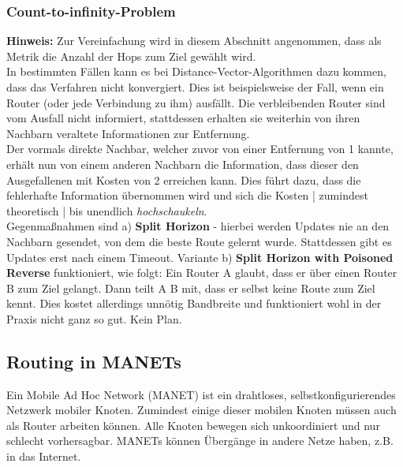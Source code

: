 \documentclass{article} %
\begin{document}
\subsubsection{Count-to-infinity-Problem}
\textbf{Hinweis:} Zur Vereinfachung wird in diesem Abschnitt angenommen, dass als Metrik die Anzahl der Hops zum Ziel gewählt wird.\\
In bestimmten Fällen kann es bei Distance-Vector-Algorithmen dazu kommen, dass das Verfahren nicht konvergiert.
Dies ist beispielsweise der Fall, wenn ein Router (oder jede Verbindung zu ihm) ausfällt.
Die verbleibenden Router sind vom Ausfall nicht informiert, stattdessen erhalten sie weiterhin von ihren Nachbarn veraltete Informationen zur Entfernung.\\
Der vormals direkte Nachbar, welcher zuvor von einer Entfernung von 1 kannte, erhält nun von einem anderen Nachbarn die Information, dass dieser den Ausgefallenen mit Kosten von 2 erreichen kann.
Dies führt dazu, dass die fehlerhafte Information übernommen wird und sich die Kosten | zumindest theoretisch | bis unendlich \emph{hochschaukeln}.\\
Gegenmaßnahmen sind a) \textbf{Split Horizon} - hierbei werden Updates nie an den Nachbarn gesendet, von dem die beste Route gelernt wurde.
Stattdessen gibt es Updates erst nach einem Timeout.
Variante b) \textbf{Split Horizon with Poisoned Reverse} funktioniert, wie folgt:
Ein Router A glaubt, dass er über einen Router B zum Ziel gelangt.
Dann teilt A B mit, dass er selbst keine Route zum Ziel kennt.
Dies kostet allerdings unnötig Bandbreite und funktioniert wohl in der Praxis nicht ganz so gut.
Kein Plan.
\subsection{Routing in MANETs}
Ein Mobile Ad Hoc Network (MANET) ist ein drahtloses, selbstkonfigurierendes Netzwerk mobiler Knoten.
Zumindest einige dieser mobilen Knoten müssen auch als Router arbeiten können.
Alle Knoten bewegen sich unkoordiniert und nur schlecht vorhersagbar.
MANETs können Übergänge in andere Netze haben, z.B. in das Internet.
\end{document}
